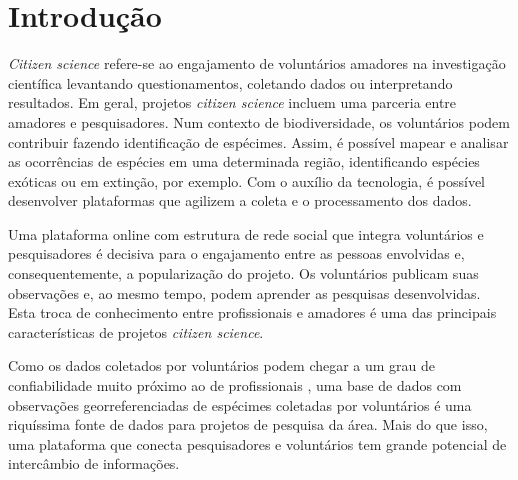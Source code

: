 \section{Introdução}
\emph{Citizen science} refere-se ao engajamento de voluntários amadores na investigação científica levantando questionamentos, coletando dados ou interpretando resultados. Em geral, projetos \emph{citizen science} incluem uma parceria entre amadores e pesquisadores. \cite{sivertown2009} Num contexto de biodiversidade, os voluntários podem contribuir fazendo identificação de espécimes. Assim, é possível mapear e analisar as ocorrências de espécies em uma determinada região, identificando espécies exóticas ou em extinção, por exemplo. \cite{miller2012} Com o auxílio da tecnologia, é possível desenvolver plataformas que agilizem a coleta e o processamento dos dados. \cite{bonney2014}

Uma plataforma online com estrutura de rede social que integra voluntários e pesquisadores é decisiva para o engajamento entre as pessoas envolvidas e, consequentemente, a popularização do projeto. Os voluntários publicam suas observações e, ao mesmo tempo, podem aprender as pesquisas desenvolvidas. Esta troca de conhecimento entre profissionais e amadores é uma das principais características de projetos \emph{citizen science}. \cite{sivertown2009}

Como os dados coletados por voluntários podem chegar a um grau de confiabilidade muito próximo ao de profissionais \cite{gollan2012, vanstrien2013}, uma base de dados com observações georreferenciadas de espécimes coletadas por voluntários é uma riquíssima fonte de dados para projetos de pesquisa da área. Mais do que isso, uma plataforma que conecta pesquisadores e voluntários tem grande potencial de intercâmbio de informações.
